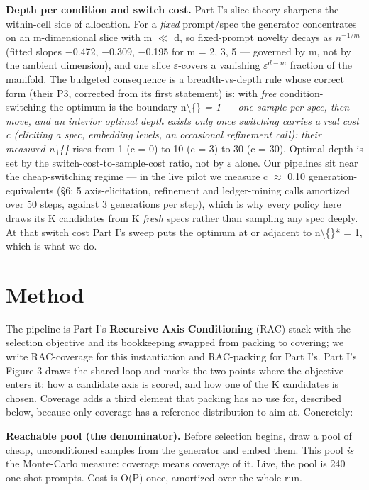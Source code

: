 \documentclass[11pt]{article}
\theoremstyle{plain}
\theoremstyle{definition}
\begin{document}
\textbf{Depth per condition and switch cost.} Part I's slice theory sharpens the within-cell side of allocation. For a \emph{fixed} prompt/spec the generator concentrates on an m-dimensional slice with m $\ll$ d, so fixed-prompt novelty decays as $n^{-1/m}$ (fitted slopes $-$0.472, $-$0.309, $-$0.195 for m = 2, 3, 5 --- governed by m, not by the ambient dimension), and one slice $\varepsilon$-covers a vanishing $\varepsilon ^{d-m}$ fraction of the manifold. The budgeted consequence is a breadth-vs-depth rule whose correct form (their P3, corrected from its first statement) is: with \emph{free} condition-switching the optimum is the boundary n\textbackslash\{\}\emph{ = 1 --- one sample per spec, then move, and an interior optimal depth exists only once switching carries a real cost c (eliciting a spec, embedding levels, an occasional refinement call): their measured n\textbackslash\{\}} rises from 1 (c = 0) to 10 (c = 3) to 30 (c = 30). Optimal depth is set by the switch-cost-to-sample-cost ratio, not by $\varepsilon$ alone. Our pipelines sit near the cheap-switching regime --- in the live pilot we measure c $\approx$ 0.10 generation-equivalents (\S{}6: 5 axis-elicitation, refinement and ledger-mining calls amortized over 50 steps, against 3 generations per step), which is why every policy here draws its K candidates from K \emph{fresh} specs rather than sampling any spec deeply. At that switch cost Part I's sweep puts the optimum at or adjacent to n\textbackslash\{\}* = 1, which is what we do.

\section{Method}
The pipeline is Part I's \textbf{Recursive Axis Conditioning} (RAC) stack with the selection objective and its bookkeeping swapped from packing to covering; we write RAC-coverage for this instantiation and RAC-packing for Part I's. Part I's Figure 3 draws the shared loop and marks the two points where the objective enters it: how a candidate axis is scored, and how one of the K candidates is chosen. Coverage adds a third element that packing has no use for, described below, because only coverage has a reference distribution to aim at. Concretely:

\textbf{Reachable pool (the denominator).} Before selection begins, draw a pool of cheap, unconditioned samples from the generator and embed them. This pool \emph{is} the Monte-Carlo measure: coverage means coverage of it. Live, the pool is 240 one-shot prompts. Cost is O(P) once, amortized over the whole run.
\end{document}
